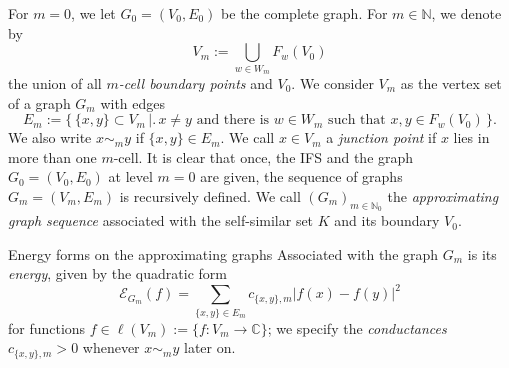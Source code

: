 \documentclass[12pt,reqno,a4paper]{amsart}            %
\makeatletter
\numberwithin{equation}{section}
\newcommand{\myfont}{\sffamily}
\theoremstyle{mythmstyle}       %
\theoremstyle{mydefstyle}        %
\renewcommand\subsection{\@startsection{subsection}{2}%
  \z@{-.5\linespacing\@plus-.7\linespacing}{.5\linespacing}%
  {\large\myfont\bfseries}}
\newcommand{\abssqr}[2][{}]{\lvert{#2}\rvert^2_{#1}} %
\newcommand{\bigset}[2]{\bigl\{ \, #1 \, \bigl|\bigr. \, #2 \, \bigr\} }
\newcommand{\map}[3]{ #1 \colon #2 \longrightarrow #3}    %
\newcommand{\C}{\mathbb{C}} %
\newcommand{\N}{\mathbb{N}} %
\newcommand{\1}{\mathbbm 1}                    %
\newcommand{\lsymb}    {\ell}          %
\newcommand{\energy}{\mathcal E}
\newcommand{\conductance}{c}  %
\newcommand{\lspace}[1]{\lsymb({#1})}   %
\makeatother
\begin{document}
For $m=0$, we let $G_0=(V_0,E_0)$ be the complete graph.  For $m \in
\N$, we denote by
\begin{equation*}
  V_m
  := \bigcup_{w \in W_m} F_w(V_0)
\end{equation*}
the union of all \emph{$m$-cell boundary points} and
$V_0$. %
We consider $V_m$ as the vertex set of a graph $G_m$ with edges
\begin{equation*}
  E_m := 
  \bigset{\{x,y\} \subset V_m}
      {\text{$x \ne y$ and there is $w \in W_m$ such that $x,y \in F_w(V_0)$}}.
\end{equation*}
We also write $x \sim_m y$ if $\{x,y\} \in E_m$.  We call $x \in V_m$
a \emph{junction point} if $x$ lies in more than one $m$-cell.  It is
clear that once, the IFS and the graph $G_0=(V_0,E_0)$ at level $m=0$
are given, the sequence of graphs $G_m=(V_m,E_m)$ is recursively
defined.  We call $(G_m)_{m \in \N_0}$ the \emph{approximating graph
  sequence} associated with the self-similar set $K$ and its boundary
$V_0$.


\subsection{Energy forms on the approximating graphs}
Associated with the graph $G_m$ is its \emph{energy}, given by the
quadratic form
\begin{equation}
  \label{eq:graph.energy'}
  \energy_{G_m}(f)
  = \sum_{ \{x,y\} \in E_m} \conductance_{\{x,y\},m} \abssqr{f(x)-f(y)}
\end{equation}
for functions $f \in \lspace{V_m}:=\{\map f {V_m} \C\}$; we specify
the \emph{conductances} $\conductance_{\{x,y\},m}>0$ whenever $x \sim_m y$
later on. 
\end{document}
